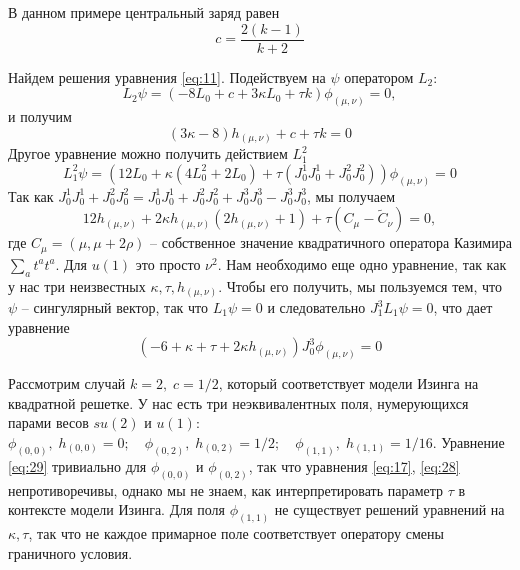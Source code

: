 В данном примере центральный заряд равен
\begin{equation}
  \label{eq:14}
  c=\frac{2(k-1)}{k+2}
\end{equation}

Найдем решения уравнения  \eqref{eq:11}. Подействуем на  $\psi$ оператором $L_{2}$:
\begin{equation}
  \label{eq:13}
  L_{2}\psi=(-8L_{0}+c+3\kappa L_{0}+\tau k)\phi_{(\mu,\nu)}=0,
\end{equation}
и получим
\begin{equation}
  \label{eq:28}
  (3\kappa-8) h_{(\mu,\nu)}+c+\tau k =0
\end{equation}
Другое уравнение можно получить действием  $L_{1}^{2}$
\begin{equation}
  \label{eq:15}
  L_{1}^{2}\psi = (12 L_{0} + \kappa(4 L_{0}^{2}+2 L_{0}) +\tau (J_{0}^{1}J_{0}^{1}+J_{0}^{2}J_{0}^{2}))\phi_{(\mu,\nu)}=0
\end{equation}
Так как $J_{0}^{1}J_{0}^{1}+J_{0}^{2}J_{0}^{2}=J_{0}^{1}J_{0}^{1}+J_{0}^{2}J_{0}^{2}+J_{0}^{3}J_{0}^{3}-J_{0}^{3}J_{0}^{3}$, мы получаем
\begin{equation}
  \label{eq:17}
  12 h_{(\mu,\nu)}+2\kappa h_{(\mu,\nu)} (2h_{(\mu,\nu)}+1) +  \tau (C_{\mu}-\tilde{C}_{\nu})=0,
\end{equation}
где $C_{\mu}=(\mu,\mu+2\rho)$ -- собственное значение квадратичного оператора Казимира $\sum_{a}t^{a}t^{a}$. Для $u(1)$ это просто $\nu^{2}$. Нам необходимо еще одно уравнение, так как у нас три неизвестных $\kappa,\tau,h_{(\mu,\nu)}$. Чтобы его получить, мы пользуемся тем, что $\psi$ -- сингулярный вектор, так что $L_{1}\psi=0$ и следовательно $J_{1}^{3}L_{1}\psi=0$, что дает уравнение
\begin{equation}
  \label{eq:29}
  \left(-6  + \kappa +  \tau +  2 \kappa h_{(\mu,\nu)}\right) J^{3}_{0} \phi_{(\mu,\nu)}=0
\end{equation}

Рассмотрим случай $k=2, \;c=1/2$, который соответствует модели Изинга на квадратной решетке. У нас есть три неэквивалентных поля, нумерующихся парами весов $su(2)$ и $u(1)$: $\phi_{(0,0)}, \; h_{(0,0)}=0; \quad \phi_{(0,2)}, \; h_{(0,2)}=1/2; \quad \phi_{(1,1)}, \; h_{(1,1)}=1/16$.
Уравнение \eqref{eq:29} тривиально для  $\phi_{(0,0)}$ и  $\phi_{(0,2)}$, так что уравнения  \eqref{eq:17}, \eqref{eq:28} непротиворечивы,  однако мы не знаем, как интерпретировать параметр  $\tau$ в контексте модели Изинга. Для поля  $\phi_{(1,1)}$ не существует решений уравнений на  $\kappa,\tau$, так что не каждое примарное поле соответствует оператору смены граничного условия.

